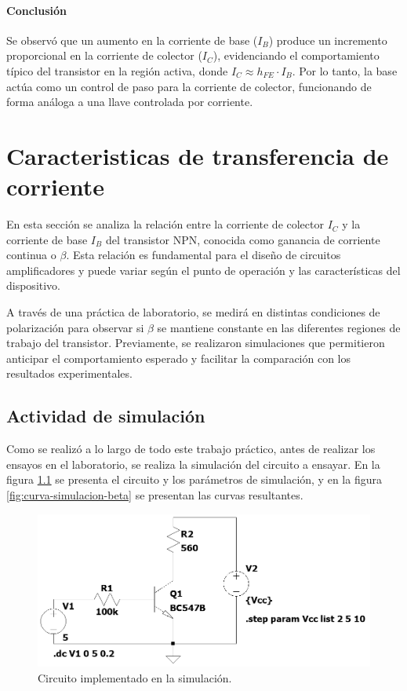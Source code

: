 \documentclass[chaptersright]{informeutn}
\begin{document}
    \subsubsection{Conclusión}
      Se observó que un aumento en la corriente de base ($I_B$) produce un incremento proporcional en la corriente de
      colector ($I_C$), evidenciando el comportamiento típico del transistor en la región activa, donde 
      $I_C \approx h_{FE} \cdot I_B$. Por lo tanto, la base actúa como un control de paso para la corriente de colector,
      funcionando de forma análoga a una llave controlada por corriente.

\chapter{Caracteristicas de transferencia de corriente}
En esta sección se analiza la relación entre la corriente de colector $I_C$ y 
la corriente de base $I_B$ del transistor NPN, conocida como ganancia de 
corriente continua o $\beta$. Esta relación es fundamental para el diseño de
circuitos amplificadores y puede variar según el punto de operación y las
características del dispositivo.

A través de una práctica de laboratorio, se medirá en distintas condiciones
de polarización para observar si $\beta$ se mantiene constante en las diferentes
regiones de trabajo del transistor. Previamente, se realizaron simulaciones
que permitieron anticipar el comportamiento esperado y facilitar la
comparación con los resultados experimentales.

  \section{Actividad de simulación}
  Como se realizó a lo largo de todo este trabajo práctico, antes de realizar
  los ensayos en el laboratorio, se realiza la simulación del circuito a
  ensayar. En la figura \ref{fig:circuito-simulacion-beta} se presenta el
  circuito y los parámetros de simulación, y en la figura
  \ref{fig:curva-simulacion-beta} se presentan las curvas resultantes.
        \begin{figure}[H]
          \centering
          \includegraphics[width=\textwidth, keepaspectratio]{pictures/circuito-simulacion-beta.png}
          \caption{Circuito implementado en la simulación.}
          \label{fig:circuito-simulacion-beta}
      \end{figure}
  
\end{document}
